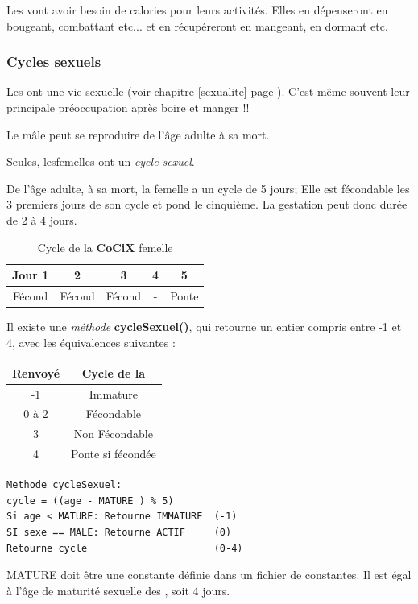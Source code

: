 \documentclass[french]{report}
\newlength{\du}\fi
\begin{document}
Les \CoCiX vont avoir besoin de calories pour leurs activités. Elles en dépenseront en bougeant, combattant etc... et en récupéreront en mangeant, en dormant etc.

\subsubsection{Cycles sexuels}\label{cycle_sexuel}
Les \CoCiX ont une vie sexuelle (voir chapitre \ref{sexualite} page \pageref{sexualite}). C'est même souvent leur principale préoccupation après boire et manger !!

Le \CoCiX mâle peut se reproduire de l'âge adulte à sa mort.

Seules, les\CoCiX femelles ont un \emph{cycle sexuel}.


De l'âge adulte, à sa mort, la \CoCiX femelle a un cycle de 5 jours; Elle est fécondable les 3 premiers jours de son cycle et pond le cinquième. La gestation peut donc durée de 2 à 4 jours.

\begin{table}[htdp]
	\caption{Cycle de la \textbf{CoCiX} femelle}
	\begin{center}
		\begin{tabular}{|c|c|c|c|c|}\hline
			Jour 1 & 2 & 3 & 4 & 5 \\ \hline
			Fécond & Fécond & Fécond & - & Ponte\\ \hline
		\end{tabular}
	\end{center}
\end{table}

Il existe une \emph{méthode} \textbf{cycleSexuel()}, qui retourne un entier compris entre -1 et 4, avec les équivalences suivantes :
\begin{center}
	\begin{tabular}{|c|c|}\hline
		Renvoyé & Cycle de la \CoCiX \\ \hline
		-1 & Immature\\ \hline
		0 à 2 & Fécondable\\ \hline
		3& Non Fécondable\\ \hline
		4& Ponte si fécondée\\ \hline
	\end{tabular}
\end{center}

\begin{lstlisting}
Methode cycleSexuel:
cycle = ((age - MATURE ) % 5)
Si age < MATURE: Retourne IMMATURE	(-1)
SI sexe == MALE: Retourne ACTIF     (0)
Retourne cycle                      (0-4)
\end{lstlisting}	
MATURE doit être une constante définie dans un fichier de constantes. Il est égal à l'âge de maturité sexuelle des \CoCiX, soit 4 jours.
\end{document}
